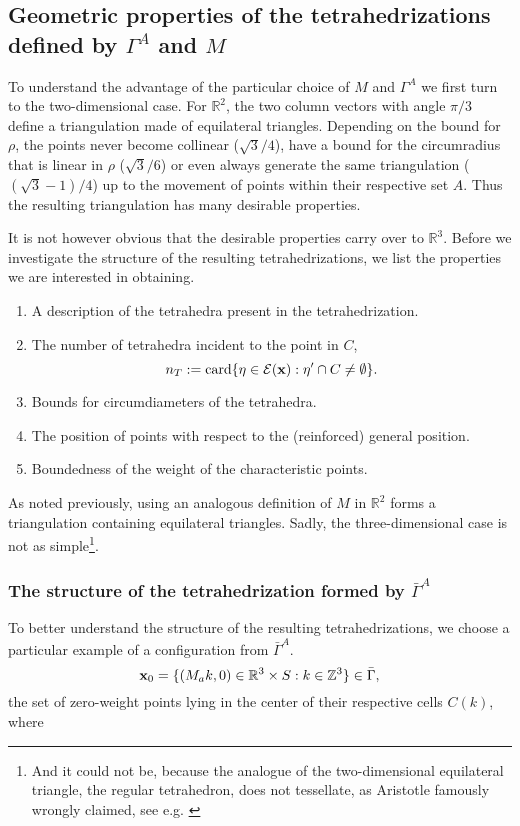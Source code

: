 \subsection{Geometric properties of the tetrahedrizations defined by $\Gamma^A$ and $M$}
To understand the advantage of the particular choice of $M$ and $\Gamma^A$ we first turn to the two-dimensional case. For $\mathbb R^2$, the two column vectors with angle $\pi/3$ define a triangulation made of equilateral triangles. Depending on the bound for $\rho$, the points never become collinear ($\sqrt 3/4$), have a bound for the circumradius that is linear in $\rho$ ($\sqrt 3/6$) or even always generate the same triangulation ($(\sqrt 3 - 1)/4$) up to the movement of points within their respective set $A$. Thus the resulting triangulation has many desirable properties. \newline

It is not however obvious that the desirable properties carry over to $\mathbb R^3$. Before we investigate the structure of the resulting tetrahedrizations, we list the properties we are interested in obtaining.
\begin{enumerate}
	\item A description of the tetrahedra present in the tetrahedrization.
	\item The number of tetrahedra incident to the point in $C$,  
		$$n_T := \mathrm{card} \{\eta \in \mathcal E({\mathbf{x}}): \eta' \cap C \neq \emptyset\}.$$
	\item Bounds for circumdiameters of the tetrahedra.
	\item The position of points with respect to the (reinforced) general position.  
	\item Boundedness of the weight of the characteristic points.
\end{enumerate}

As noted previously, using an analogous definition of $M$ in $\mathbb R^2$ forms a triangulation containing equilateral triangles. Sadly, the three-dimensional case is not as simple\footnote{And it could not be, because the analogue of the two-dimensional equilateral triangle, the regular tetrahedron, does not tessellate, as Aristotle famously wrongly claimed, see e.g. \cite{Lagarias12}}.

\subsubsection{The structure of the tetrahedrization formed by $\bar\Gamma^A$}
To better understand the structure of the resulting tetrahedrizations, we choose a particular example of a configuration from $\bar\Gamma^A$. 
$${\mathbf{x}}_0 = \{(M_ak,0) \in {\mathbb R^3}\times S: k \in \mathbb Z^3\} \in \bar\Gamma,$$ 
the set of zero-weight points lying in the center of their respective cells $C(k)$, where

